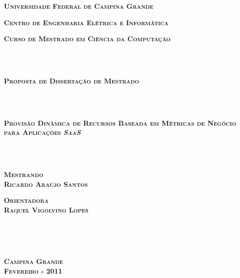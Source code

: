 \documentclass[a4paper,titlepage,12pt]{article}
\begin{document}

\pagestyle{empty}

\begin{center}
{\textbf{\Large \textsc{Universidade Federal de Campina Grande}}}
\end{center}

\begin{center}
\textbf{{\Large \textsc{Centro de Engenharia Elétrica e Informática}}}
\end{center}

\begin{center}
{\large \textsc{\textbf{Curso de Mestrado em Ciência da Computação}}}
\end{center}

~\\ \\

\begin{center}
{\LARGE \textsc{\textbf{Proposta de Dissertação de Mestrado}}}
\end{center}

~\\ \\

\begin{center}
{\Large \textsc{\textbf{Provisão Dinâmica de Recursos Baseada em Métricas de Negócio para Aplicações \textit{SaaS}}}}
\end{center}

~\\ \\

\begin{center}
\textbf{\textsc{Mestrando} \\
\textsc{Ricardo Araújo Santos}}
\end{center}

\begin{center}
\textbf{\textsc{Orientadora} \\
\textsc{Raquel Vigolvino Lopes}}
\end{center}

~\\ \\ \\

\begin{center}
\textbf{{\large \textsc{Campina Grande}}
\\
{\large \textsc{Fevereiro - 2011}}}
\end{center}
\end{document}
